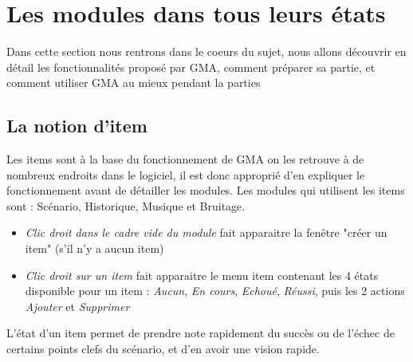 \documentclass[12pt]{article}
\begin{document}
\section{Les modules dans tous leurs états}\label{details}
Dans cette section nous rentrons dans le coeurs du sujet, nous allons découvrir en détail les fonctionnalités proposé par GMA, comment préparer sa partie, et comment utiliser GMA au mieux pendant la parties

\subsection{La notion d'item}\label{item}
Les items sont à la base du fonctionnement de GMA on les retrouve à de nombreux endroits dans le logiciel, il est donc approprié d'en expliquer le fonctionnement avant de détailler les modules.
Les modules qui utilisent les items sont : Scénario, Historique, Musique et Bruitage.

\begin{itemize}
    \item\emph{Clic droit dans le cadre vide du module} fait apparaitre la fenêtre "créer un item" (s'il n'y a aucun item)
    \item\emph{Clic droit sur un item} fait apparaitre le menu item contenant les 4 états disponible pour un item : \emph{Aucun}, \emph{En cours}, \emph{Echoué}, \emph{Réussi}, puis les 2 actions \emph{Ajouter} et \emph{Supprimer}
\end{itemize}
L'état d'un item permet de prendre note rapidement du succès ou de l'échec de certains points clefs du scénario, et d'en avoir une vision rapide.\\
\end{document}

